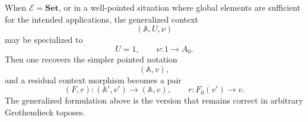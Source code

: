 \begin{remark}
\label{rem:recovery-of-pointwise-presentation}
    When \(\mathcal E=\mathbf{Set}\), or in a well-pointed situation where
    global elements are sufficient for the intended applications, the
    generalized context
    \[
        (\mathbb A,U,\nu)
    \]
    may be specialized to
    \[
        U=1,
        \qquad
        \nu:1\to A_0.
    \]
    Then one recovers the simpler pointed notation
    \[
        (\mathbb A,v),
    \]
    and a residual context morphism becomes a pair
    \[
        (F,r):(\mathbb A',v')\to(\mathbb A,v),
        \qquad
        r:F_0(v')\to v.
    \]
    The generalized formulation above is the version that remains correct in
    arbitrary Grothendieck toposes.
\end{remark}

